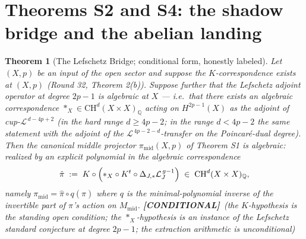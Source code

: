 \documentclass[11pt]{article}
\newtheorem{theorem}{Theorem}
\newcommand{\COND}{\textbf{[CONDITIONAL]}}
\newcommand{\Q}{\mathbb{Q}}
\newcommand{\CH}{\mathrm{CH}}
\begin{document}
\section{Theorems S2 and S4: the shadow bridge and the abelian landing}

\begin{theorem}[The Lefschetz Bridge; conditional form, honestly labeled]\label{thm:s2}
Let $(X,p)$ be an input of the open sector and suppose the
$K$-correspondence exists at $(X,p)$ (Round 32, Theorem 2(b)). Suppose
further that the \emph{Lefschetz adjoint operator at degree $2p-1$} is
algebraic at $X$ --- i.e.\ that there exists an algebraic correspondence
$\ast_X\in\CH^{d}(X\times X)_\Q$ acting on $H^{2p-1}(X)$ as the adjoint of
cup-$\mathcal L^{\,d-4p+2}$ (in the hard range $d\ge4p-2$; in the range
$d<4p-2$ the same statement with the adjoint of the
$\mathcal L^{\,4p-2-d}$-transfer on the Poincaré-dual degree). Then the
canonical middle projector $\pi_{\mathrm{mid}}(X,p)$ of Theorem \emph{S1} is
algebraic: realized by an explicit polynomial in the algebraic
correspondence
\[
\hat\pi\;:=\;K\circ\Bigl(\ast_X\circ K^{t}\circ
\Delta_{J,*}\mathcal L_{J}^{\,g-1}\Bigr)\;\in\;\CH^{d}(X\times X)_\Q,
\]
namely $\pi_{\mathrm{mid}}=\hat\pi\circ q(\hat\pi)$ where $q$ is the
minimal-polynomial inverse of the invertible part of $\hat\pi$'s action on
$M_{\mathrm{mid}}$.
\COND{}\ (the $K$-hypothesis is the standing open condition; the
$\ast_X$-hypothesis is an instance of the Lefschetz standard conjecture at
degree $2p-1$; the extraction arithmetic is unconditional)
\end{theorem}
\end{document}
